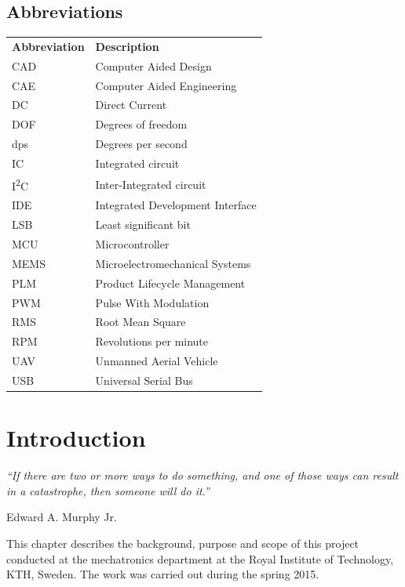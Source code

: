 \documentclass[a4paper,11pt]{kth-mag}
\begin{document}
\section*{Abbreviations}
\noindent{}\begin{tabular}{@{}p{2.5cm}l}
\textbf{Abbreviation} 	& \textbf{Description} \vspace{.5em} \\
CAD			& Computer Aided Design \\
CAE			& Computer Aided Engineering\\
DC			& Direct Current \\
DOF			& Degrees of freedom\\
dps			& Degrees per second\\
IC			& Integrated circuit\\
I\textsuperscript{2}C		& Inter-Integrated circuit\\
IDE 			& Integrated Development Interface \\
LSB			& Least significant bit \\
MCU			& Microcontroller\\
MEMS			& Microelectromechanical Systems \\
PLM			& Product Lifecycle Management\\
PWM			& Pulse With Modulation\\
RMS			& Root Mean Square\\
RPM			& Revolutions per minute\\
UAV			& Unmanned Aerial Vehicle\\
USB			& Universal Serial Bus
\end{tabular}
\cleardoublepage

\mainmatter
\pagestyle{newchap}


\chapter{Introduction}

\epigraph{\textit{“If there are two or more ways to do something, and one of those ways can result in a catastrophe, then someone will do it.”}}{Edward A. Murphy Jr.}

This chapter describes the background, purpose and scope of this project conducted at the mechatronics department at the Royal Institute of Technology, KTH, Sweden. The work was carried out during the spring 2015.
\end{document}
